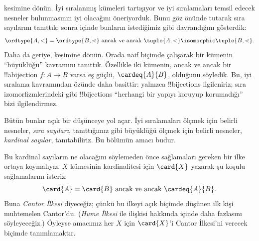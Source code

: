\documentclass[../../../include/open-logic-section]{subfiles}
\begin{document}

 kesimine dönün. İyi sıralanmış kümeleri
tartışıyor ve iyi sıralamaları temsil edecek nesneler bulunmasının iyi
olacağını öneriyorduk. Bunu göz önünde tutarak sıra sayılarını tanıttık;
sonra  içinde bunların
istediğimiz gibi davrandığını gösterdik:
\[
	\ordtype{A, <} = \ordtype{B, \lessdot}
	\text{ ancak ve ancak } \tuple{A, <} \isomorphic \tuple{B, \lessdot}.
\]
Daha da geriye,  kesimine dönün. Orada naif
biçimde çalışarak bir kümenin ``büyüklüğü'' kavramını tanıttık. Özellikle
iki kümenin, ancak ve ancak bir !!a{bijection} $f\colon A\to B$ varsa
eş güçlü, $\cardeq{A}{B}$, olduğunu söyledik. Bu, iyi sıralama kavramından
özünde daha basittir: yalnızca !!{bijection}s ilgileniriz; sıra
izomorfizmlerindeki gibi !!{bijection}s ``herhangi bir yapıyı koruyup
korumadığı'' bizi ilgilendirmez.

Bütün bunlar açık bir düşünceye yol açar. İyi sıralamaları ölçmek için
belirli nesneler, \emph{sıra sayıları}, tanıttığımız gibi büyüklüğü ölçmek
için belirli nesneler, \emph{kardinal sayılar}, tanıtabiliriz. Bu bölümün
amacı budur.

Bu kardinal sayıların ne olacağını söylemeden önce sağlamaları gereken bir
ilke ortaya koymalıyız. $X$ kümesinin kardinalitesi için $\card{X}$ yazarak
şu koşulu sağlamalarını isteriz:
\[
	\card{A} = \card{B} \text{ ancak ve ancak } \cardeq{A}{B}.
\]
Buna \emph{Cantor İlkesi} diyeceğiz; çünkü bu ilkeyi açık biçimde düşünen
ilk kişi muhtemelen Cantor'du. (\emph{Hume İlkesi} ile ilişkisi hakkında
 içinde daha fazlasını söyleyeceğiz.) Öyleyse amacımız her
$X$ için $\card{X}$'i Cantor İlkesi'ni verecek biçimde tanımlamaktır.
\end{document}
